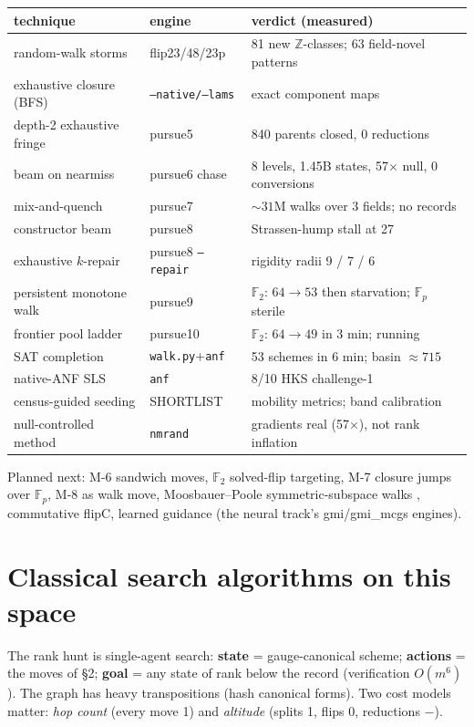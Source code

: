 \documentclass[10pt]{article}
\begin{document}
\begin{center}\small
\begin{tabular}{lll}
\toprule
technique & engine & verdict (measured)\\
\midrule
random-walk storms & flip23/48/23p & 81 new $\mathbb{Z}$-classes; 63 field-novel patterns\\
exhaustive closure (BFS) & \texttt{--native/--lams} & exact component maps\\
depth-2 exhaustive fringe & pursue5 & 840 parents closed, 0 reductions\\
beam on nearmiss & pursue6 chase & 8 levels, 1.45B states, 57$\times$ null, 0 conversions\\
mix-and-quench & pursue7 & ${\sim}31$M walks over 3 fields; no records\\
constructor beam & pursue8 & Strassen-hump stall at 27\\
exhaustive $k$-repair & pursue8 \texttt{--repair} & rigidity radii 9 / 7 / 6\\
persistent monotone walk & pursue9 & $\mathbb{F}_2$: $64\to53$ then starvation; $\mathbb{F}_p$ sterile\\
frontier pool ladder & pursue10 & $\mathbb{F}_2$: $64\to49$ in 3 min; running\\
SAT completion & \texttt{walk.py}+\texttt{anf} & 53 schemes in 6 min; basin ${\approx}715$\\
native-ANF SLS & \texttt{anf} & 8/10 HKS challenge-1\\
census-guided seeding & SHORTLIST & mobility metrics; band calibration\\
null-controlled method & \texttt{nmrand} & gradients real (57$\times$), not rank inflation\\
\bottomrule
\end{tabular}
\end{center}

Planned next: M-6 sandwich moves, $\mathbb{F}_2$ solved-flip
targeting, M-7 closure jumps over $\mathbb{F}_p$, M-8 as walk move,
Moosbauer--Poole symmetric-subspace walks \cite{mp}, commutative
flipC, learned guidance (the neural track's gmi/gmi\_mcgs engines).

\section{Classical search algorithms on this space}

The rank hunt is single-agent search: \textbf{state} =
gauge-canonical scheme; \textbf{actions} = the moves of \S2;
\textbf{goal} = any state of rank below the record (verification
$O(m^6)$). The graph has heavy transpositions (hash canonical
forms). Two cost models matter: \emph{hop count} (every move 1) and
\emph{altitude} (splits 1, flips 0, reductions $-$).
\end{document}
